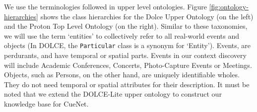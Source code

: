 We use the terminologies followed in upper level ontologies. Figure \ref{fig:ontology-hierarchies} shows the class hierarchies for the Dolce Upper Ontology (on the left) and the Proton Top Level Ontology (on the right). Similar to these taxonomies, we will use the term `entities' to collectively refer to all real-world events and objects (In DOLCE, the \texttt{Particular} class is a synonym for `Entity'). Events, are perdurants, and have temporal or spatial parts. Events in our context discovery will include Academic Conferences, Concerts, Photo-Capture Events or Meetings. Objects, such as Persons, on the other hand, are uniquely identifiable wholes. They do not need temporal or spatial attributes for their description. It must be noted that we extend the DOLCE-Lite upper ontology to construct our knowledge base for CueNet.


